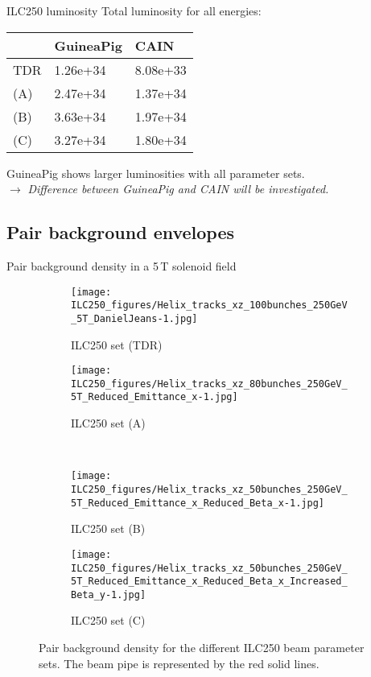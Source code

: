 \documentclass[xcolor={dvipsnames}]{beamer}
\begin{document}
\begin{frame}{ILC250 luminosity}
Total luminosity for all energies:
 \begin{table}
\label{tab:Parameters}
\centering
\begin{tabularx}{0.55\textwidth}{lll}
\hline\hline
 [cm$^{-2}$s$^{-1}$] & GuineaPig & CAIN \\
\hline
\cline{1-3}
\hline
 TDR & 1.26e+34 & 8.08e+33 \\
 (A) & 2.47e+34 & 1.37e+34 \\
 (B) & 3.63e+34 & 1.97e+34 \\
 (C) & 3.27e+34 & 1.80e+34 \\
\hline\hline
\end{tabularx}
\end{table}
GuineaPig shows larger luminosities with all parameter sets.\\
\vspace*{0.3cm}
$\rightarrow$ \textit{Difference between GuineaPig and CAIN will be investigated.}
\end{frame}

\subsection{Pair background envelopes}
\begin{frame}{Pair background density in a 5\,T solenoid field}
 \begin{figure}
\centering
\begin{subfigure}[t]{0.35\textwidth}
\centering
\texttt{[image: ILC250\_figures/Helix\_tracks\_xz\_100bunches\_250GeV\_5T\_DanielJeans-1.jpg]}
\caption{ILC250 set (TDR)}
\end{subfigure}
\hspace*{0.1cm}
\begin{subfigure}[t]{0.35\textwidth}
\centering
\texttt{[image: ILC250\_figures/Helix\_tracks\_xz\_80bunches\_250GeV\_5T\_Reduced\_Emittance\_x-1.jpg]}
\caption{ILC250 set (A)}
\end{subfigure}
\\
\begin{subfigure}[t]{0.35\textwidth}
\centering
\texttt{[image: ILC250\_figures/Helix\_tracks\_xz\_50bunches\_250GeV\_5T\_Reduced\_Emittance\_x\_Reduced\_Beta\_x-1.jpg]}
\caption{ILC250 set (B)}
\end{subfigure}
\hspace*{0.1cm}
\begin{subfigure}[t]{0.35\textwidth}
\centering
\texttt{[image: ILC250\_figures/Helix\_tracks\_xz\_50bunches\_250GeV\_5T\_Reduced\_Emittance\_x\_Reduced\_Beta\_x\_Increased\_Beta\_y-1.jpg]}
\caption{ILC250 set (C)}
\end{subfigure}
\caption{Pair background density for the different ILC250 beam parameter sets.
The beam pipe is represented by the red solid lines.}
\label{fig:Envelopes}
\end{figure}

\end{frame}
\end{document}
